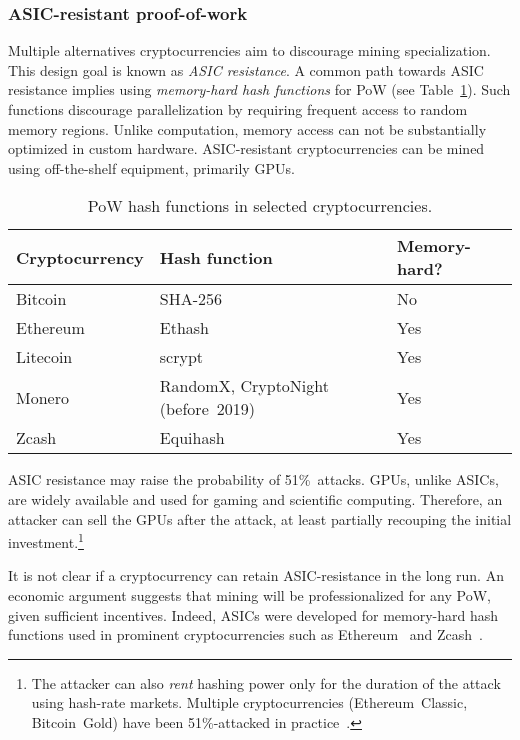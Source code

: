 \subsubsection*{ASIC-resistant proof-of-work}

Multiple alternatives cryptocurrencies aim to discourage mining specialization.
This design goal is known as \textit{ASIC resistance}.
A common path towards ASIC resistance implies using \textit{memory-hard hash functions} for PoW (see Table~\ref{tab:pow-coins-hash-functions}).
Such functions discourage parallelization by requiring frequent access to random memory regions.
Unlike computation, memory access can not be substantially optimized in custom hardware.
ASIC-resistant cryptocurrencies can be mined using off-the-shelf equipment, primarily GPUs.

\begin{table}[]
	\caption{PoW hash functions in selected cryptocurrencies.}
	\begin{tabular}{|l|l|l|}
		\hline
		\textbf{Cryptocurrency} & \textbf{Hash function} & \textbf{Memory-hard?} \\ \hline
		Bitcoin & SHA-256 & No \\ \hline
		Ethereum & Ethash & Yes \\ \hline
		Litecoin & scrypt & Yes \\ \hline
		Monero & RandomX, CryptoNight (before~2019) & Yes \\ \hline
		Zcash & Equihash & Yes \\ \hline
	\end{tabular}
	\label{tab:pow-coins-hash-functions}
\end{table}

ASIC resistance may raise the probability of 51\%~attacks.
GPUs, unlike ASICs, are widely available and used for gaming and scientific computing.
Therefore, an attacker can sell the GPUs after the attack, at least partially recouping the initial investment.\footnote{The attacker can also \textit{rent} hashing power only for the duration of the attack using hash-rate markets. Multiple cryptocurrencies (Ethereum~Classic, Bitcoin~Gold) have been 51\%-attacked in practice~\cite{Xazax3102019}.}

It is not clear if a cryptocurrency can retain ASIC-resistance in the long run.
An economic argument suggests that mining will be professionalized for any PoW, given sufficient incentives.
Indeed, ASICs were developed for memory-hard hash functions used in prominent cryptocurrencies such as Ethereum~\cite{OLeary2018} and Zcash~\cite{Floyd2018}.

